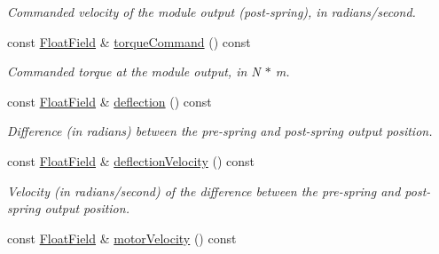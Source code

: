\begin{DoxyCompactItemize}
\begin{DoxyCompactList}\small\item\em Commanded velocity of the module output (post-\/spring), in radians/second. \end{DoxyCompactList}\item 
const \hyperlink{classhebi_1_1Feedback_1_1FloatField}{Float\+Field} \& \hyperlink{classhebi_1_1Feedback_1_1Actuator_a6a870cdad792a5034bb40b3d4c0beafe}{torque\+Command} () const \hypertarget{classhebi_1_1Feedback_1_1Actuator_a6a870cdad792a5034bb40b3d4c0beafe}{}\label{classhebi_1_1Feedback_1_1Actuator_a6a870cdad792a5034bb40b3d4c0beafe}

\begin{DoxyCompactList}\small\item\em Commanded torque at the module output, in N $\ast$ m. \end{DoxyCompactList}\item 
const \hyperlink{classhebi_1_1Feedback_1_1FloatField}{Float\+Field} \& \hyperlink{classhebi_1_1Feedback_1_1Actuator_a55080e3980d94ef328296ccfcd02a9ad}{deflection} () const \hypertarget{classhebi_1_1Feedback_1_1Actuator_a55080e3980d94ef328296ccfcd02a9ad}{}\label{classhebi_1_1Feedback_1_1Actuator_a55080e3980d94ef328296ccfcd02a9ad}

\begin{DoxyCompactList}\small\item\em Difference (in radians) between the pre-\/spring and post-\/spring output position. \end{DoxyCompactList}\item 
const \hyperlink{classhebi_1_1Feedback_1_1FloatField}{Float\+Field} \& \hyperlink{classhebi_1_1Feedback_1_1Actuator_a1f38ec27ce5b8333c19de9ada2b2cc4c}{deflection\+Velocity} () const \hypertarget{classhebi_1_1Feedback_1_1Actuator_a1f38ec27ce5b8333c19de9ada2b2cc4c}{}\label{classhebi_1_1Feedback_1_1Actuator_a1f38ec27ce5b8333c19de9ada2b2cc4c}

\begin{DoxyCompactList}\small\item\em Velocity (in radians/second) of the difference between the pre-\/spring and post-\/spring output position. \end{DoxyCompactList}\item 
const \hyperlink{classhebi_1_1Feedback_1_1FloatField}{Float\+Field} \& \hyperlink{classhebi_1_1Feedback_1_1Actuator_ad11fa9011f1d9a3adc23bdd34a2d27fe}{motor\+Velocity} () const \hypertarget{classhebi_1_1Feedback_1_1Actuator_ad11fa9011f1d9a3adc23bdd34a2d27fe}{}\label{classhebi_1_1Feedback_1_1Actuator_ad11fa9011f1d9a3adc23bdd34a2d27fe}


\end{DoxyCompactItemize}
